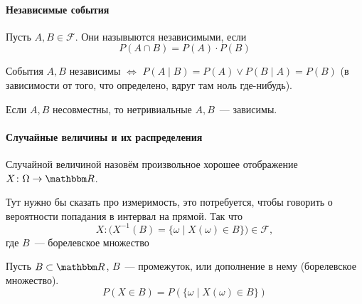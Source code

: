 \documentclass[12pt,timbord]{../../../notes}
\begin{document}
\paragraph{Независимые события}
\label{par:prob::indep}

\begin{defn}\label{defn:prob::indep::indep}
  Пусть $A, B\in \mathcal F$. Они назывыются независимыми, если 
  \[
    P(A\cap B) = P(A)\cdot P(B)
  \]
\end{defn}

\begin{prop}\label{prop:prob::indep::cond}
  События $A,B$ независимы $ \Leftrightarrow $ $P(A\mid B) = P(A) \lor P(B\mid A) = P(B)$ (в
  зависимости от того, что определено, вдруг там ноль где-нибудь).
\end{prop}
\begin{prop}\label{prop:prob::indep::zerodep}
  Если $A,B$ несовместны, то нетривиальные $A,B$~--- зависимы.
\end{prop}

\paragraph{Случайные величины и их распределения}
\label{par:prob::randscal}

\begin{defn}\label{defn:prob::randscal::randscal}
  Случайной величиной назовём произвольное хорошее отображение $X\colon \Omega \to \R$.
  
  \begin{itaux}
    Тут нужно бы сказать про измеримость, это потребуется, чтобы говорить о вероятности попадания в
    интервал на прямой. Так что \[
      X\colon \bigl(X^{-1} (B) =\{\omega \mid X(\omega)\in B\}\bigr)\in \mathcal F,
    \]
    где $B$~--- борелевское множество
  \end{itaux}

\end{defn}

\begin{defn}\label{defn:prob::randscal::inborel}
  Пусть $B\subset \R$, $B$~--- промежуток, или дополнение в нему (борелевское множество).
  \[
    P(X\in B) = P(\{\omega \mid X(\omega) \in B\})
  \]
\end{defn}
\end{document}
